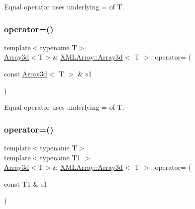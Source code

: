 Equal operator uses underlying = of T. 

\mbox{\label{classXMLArray_1_1Array3d_a797bc6cb731b7e9a8fbe0bf72d87678e}} 
\subsubsection{\texorpdfstring{operator=()}{operator=()}\hspace{0.1cm}{\footnotesize\ttfamily [2/4]}}
{\footnotesize\ttfamily template$<$typename T$>$ \\
\mbox{\hyperlink{classXMLArray_1_1Array3d}{Array3d}}$<$T$>$\& \mbox{\hyperlink{classXMLArray_1_1Array3d}{X\+M\+L\+Array\+::\+Array3d}}$<$ T $>$\+::operator= (\begin{DoxyParamCaption}\item[{const \mbox{\hyperlink{classXMLArray_1_1Array3d}{Array3d}}$<$ T $>$ \&}]{s1 }\end{DoxyParamCaption})\hspace{0.3cm}{\ttfamily [inline]}}



Equal operator uses underlying = of T. 

\mbox{\label{classXMLArray_1_1Array3d_a64543f39150c0d468eb6bef6ea73c1c6}} 
\subsubsection{\texorpdfstring{operator=()}{operator=()}\hspace{0.1cm}{\footnotesize\ttfamily [3/4]}}
{\footnotesize\ttfamily template$<$typename T$>$ \\
template$<$typename T1 $>$ \\
\mbox{\hyperlink{classXMLArray_1_1Array3d}{Array3d}}$<$T$>$\& \mbox{\hyperlink{classXMLArray_1_1Array3d}{X\+M\+L\+Array\+::\+Array3d}}$<$ T $>$\+::operator= (\begin{DoxyParamCaption}\item[{const T1 \&}]{s1 }\end{DoxyParamCaption})\hspace{0.3cm}{\ttfamily [inline]}}



